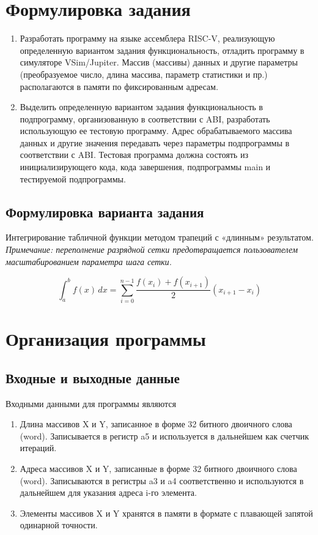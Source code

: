 






\section{Формулировка задания}
\begin{enumerate}
\item Разработать программу на языке ассемблера RISC-V, реализующую определенную вариантом задания функциональность, отладить программу в симуляторе VSim/Jupiter. Массив (массивы) данных и другие параметры (преобразуемое число, длина массива, параметр статистики и пр.) располагаются в памяти по фиксированным адресам.
\item Выделить определенную вариантом задания функциональность в подпрограмму, организованную в соответствии с ABI, разработать использующую ее тестовую программу. Адрес обрабатываемого массива данных и другие значения передавать через параметры подпрограммы в соответствии с ABI. Тестовая программа должна состоять из инициализирующего кода, кода завершения, подпрограммы main и тестируемой подпрограммы.
\end{enumerate}

\subsection{ Формулировка варианта задания}
Интегрирование табличной функции методом трапеций с «длинным» результатом.
\textit{Примечание: переполнение разрядной сетки предотвращается пользователем масштабированием параметра шага сетки.}

\[ \int_{a}^{b} f(x) \,dx = \sum_{i=0}^{n-1} \frac{f(x_i) + f(x_{i+1})}{2}(x_{i+1}-x_i) \]

\section{Организация программы}
\subsection{Входные и выходные данные}
Входными данными для программы являются 
\begin{enumerate}
\item  Длина массивов X и Y, записанное в форме 32 битного двоичного слова (word). Записывается в регистр a5 и используется в дальнейшем как счетчик итераций. 
\item Адреса массивов X и Y, записанные в форме 32 битного двоичного слова (word). Записываются в регистры a3 и a4 соответственно и используются в дальнейшем для указания адреса i-го элемента.
\item Элементы массивов X и Y хранятся в памяти в формате с плавающей запятой одинарной точности. 
\end{enumerate}

